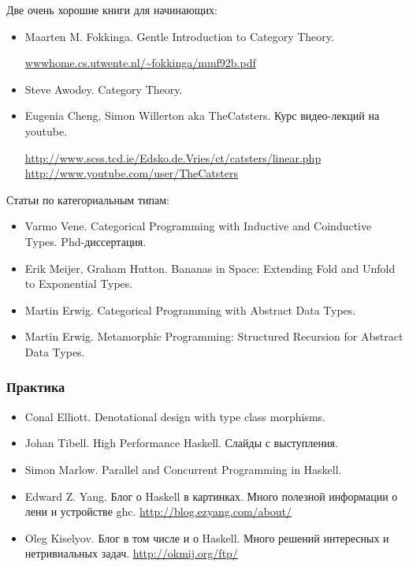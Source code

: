 Две очень хорошие книги для начинающих:

\begin{itemize}
\item Maarten M. Fokkinga. Gentle Introduction to Category Theory.

\url{wwwhome.cs.utwente.nl/~fokkinga/mmf92b.pdf}

\item Steve Awodey. Category Theory.
    
\end{itemize}

\begin{itemize}

\item Eugenia Cheng, Simon Willerton aka TheCatsters. Курс видео-лекций
    на youtube. 

    \url{http://www.scss.tcd.ie/Edsko.de.Vries/ct/catsters/linear.php}
    \url{http://www.youtube.com/user/TheCatsters}
\end{itemize}

Статьи по категориальным типам:

\begin{itemize}

\item Varmo Vene. Categorical Programming 
    with Inductive and Coinductive Types. Phd-диссертация.
    
\item Erik Meijer, Graham Hutton.
    Bananas in Space: Extending Fold and Unfold to Exponential Types.

\item Martin Erwig. Categorical Programming with Abstract Data Types.

\item Martin Erwig. Metamorphic Programming: Structured Recursion 
    for Abstract Data Types.

\end{itemize}

\subsubsection{Практика}

\begin{itemize}
\item Conal Elliott. Denotational design with type class morphisms.

\item Johan Tibell. High Performance Haskell. Слайды с выступления. 

\item Simon Marlow. Parallel and Concurrent Programming in Haskell.

\item Edward Z. Yang. Блог о Haskell в картинках. Много
    полезной информации о лени и устройстве ghc.
    \url{http://blog.ezyang.com/about/}

\item Oleg Kiselyov. Блог в том числе и о Haskell. Много решений интересных
    и нетривиальных задач. 
\url{http://okmij.org/ftp/}

\end{itemize}


